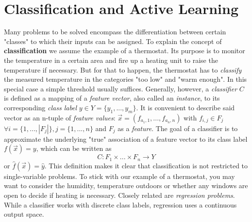 \section{Classification and Active Learning}
Many problems to be solved encompass the differentiation between certain "classes" to which their inputs can be assigned. To explain the concept of \textbf{classification} we assume the example of a thermostat. Its purpose is to monitor the temperature in a certain area and fire up a heating unit to raise the temperature if necessary. But for that to happen, the thermostat has to \textit{classify} the measured temperature in the categories "too low" and "warm enough". In this special case a simple threshold usually suffices. Generally, however, a \textit{classifier} $C$ is defined as a mapping of a \textit{feature vector}, also called an \textit{instance}, to its corresponding \textit{class label} $y \in Y = \{y_1, ..., y_m\}$. It is convenient to describe said vector as an n-tuple of \textit{feature values}: $\vec{x} = (f_{a_1,1}, ..., f_{a_n, n})$ with $f_{i,j} \in F_j$ $\forall i = \{1, ..., |F_j|\}, j = \{1, ..., n\}$ and $F_j$ as a \textit{feature}. The goal of a classifier is to approximate the underlying "true" association of a feature vector to its class label $f(\vec{x}) = y$, which can be written as
\begin{equation}
C: F_1 \times ... \times F_n \rightarrow Y
\end{equation}
or $\hat{f}(\vec{x}) = \hat{y}$\cite{RodriguezEtAl2013}. This definition makes it clear that classification is not restricted to single-variable problems. To stick with our example of a thermostat, you may want to consider the humidity, temperature outdoors or whether any windows are open to decide if heating is necessary. Closely related are \textit{regression problems}. While a classifier works with discrete class labels, regression uses a continuous output space.

